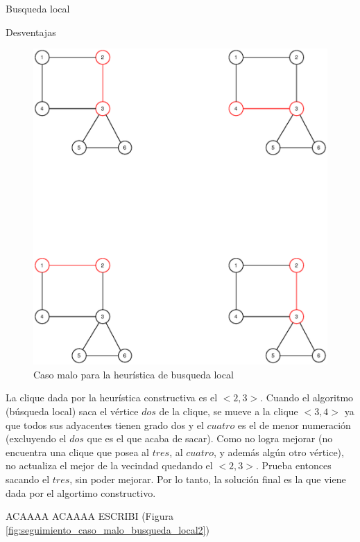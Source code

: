 \begin{section}{Busqueda local}
\begin{subsection}{Desventajas}
			\begin{figure}[H]
				\centering
		    	\includegraphics[scale=0.5]{busqueda_local/segCasoMalo.eps}
			    \caption{Caso malo para la heurística de busqueda local}
			    \label{fig:seguimiento_caso_malo_busqueda_local}
			\end{figure}


		La clique dada por la heurística constructiva es el $<2,3>$.
		Cuando el algoritmo (búsqueda local) saca el vértice $dos$ de la clique, se mueve a la clique $<3,4>$ ya que todos sus adyacentes tienen grado dos y el $cuatro$ es el de menor numeración (excluyendo el $dos$ que es el que acaba de sacar). Como no logra mejorar (no encuentra una clique que posea al $tres$, al $cuatro$, y además algún otro vértice), no actualiza el mejor de la vecindad quedando el $<2,3>$. Prueba entonces sacando el $tres$, sin poder mejorar. Por lo tanto, la solución final es la que viene dada por el algortimo constructivo.

		ACAAAA ACAAAA ESCRIBI
		(Figura \ref{fig:seguimiento_caso_malo_busqueda_local2})


\end{subsection}
\end{section}
